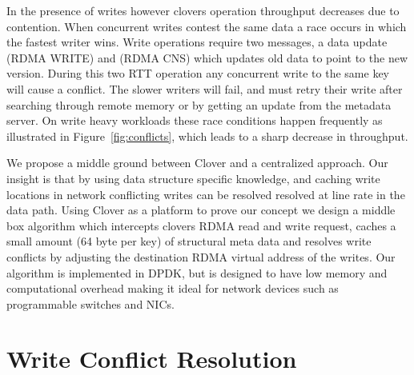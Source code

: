 In the presence of writes however clovers operation throughput
decreases due to contention. When concurrent writes contest the same
data a race occurs in which the fastest writer wins. Write operations
require two messages, a data update (RDMA WRITE) and (RDMA CNS) which
updates old data to point to the new version. During this two RTT
operation any concurrent write to the same key will cause a conflict.
The slower writers will fail, and must retry their write after
searching through remote memory or by getting an update from the
metadata server.  On write heavy workloads these race conditions
happen frequently as illustrated in Figure~\ref{fig:conflicts}, which
leads to a sharp decrease in throughput.

We propose a middle ground between Clover and a centralized approach.
Our insight is that by using data structure specific knowledge, and
caching write locations in network conflicting writes can be resolved
resolved at line rate in the data path.  Using Clover as a platform to
prove our concept we design a middle box algorithm which intercepts
clovers RDMA read and write request, caches a small amount (64 byte
per key) of structural meta data and resolves write conflicts by
adjusting the destination RDMA virtual address of the writes. Our
algorithm is implemented in DPDK, but is designed to have low memory
and computational overhead making it ideal for network devices such as
programmable switches and NICs.



\section{Write Conflict Resolution}


